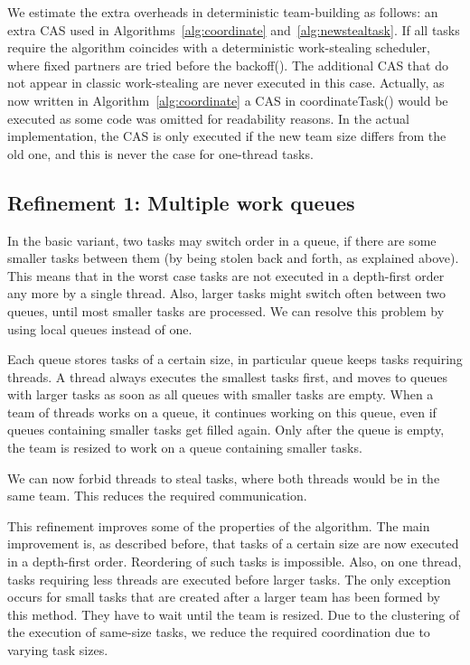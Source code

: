 \documentclass[preprint]{sigplanconf}
\begin{document}
We estimate the extra overheads in deterministic team-building as
follows: an extra CAS used in Algorithms~\ref{alg:coordinate}
and~\ref{alg:newstealtask}. If all tasks require  the algorithm
coincides with a deterministic work-stealing scheduler, where 
fixed partners are tried before the backoff(). The additional CAS that
do not appear in classic work-stealing are never executed in this
case. Actually, as now written in Algorithm~\ref{alg:coordinate} a CAS
in coordinateTask() would be executed as some code was omitted for
readability reasons. In the actual implementation, the CAS is only
executed if the new team size differs from the old one, and this is
never the case for one-thread tasks.

\subsection{Refinement 1: Multiple work queues}

In the basic variant, two tasks may switch order in a queue, if there
are some smaller tasks between them (by being stolen back and forth,
as explained above). This means that in the worst case tasks are not
executed in a depth-first order any more by a single thread. Also,
larger tasks might switch often between two queues, until most smaller
tasks are processed. We can resolve this problem by using 
local queues instead of one.

Each queue stores tasks of a certain size, in particular queue 
keeps tasks requiring  threads. A thread always executes the
smallest tasks first, and moves to queues with larger tasks as soon as
all queues with smaller tasks are empty. When a team of threads works
on a queue, it continues working on this queue, even if queues
containing smaller tasks get filled again. Only after the queue is
empty, the team is resized to work on a queue containing smaller
tasks.

We can now forbid threads to steal tasks, where both threads would
be in the same team. This reduces the required communication.

This refinement improves some of the properties of the algorithm. The
main improvement is, as described before, that tasks of a certain size
are now executed in a depth-first order. Reordering of such tasks is
impossible. Also, on one thread, tasks requiring less threads are
executed before larger tasks. The only exception occurs for small
tasks that are created after a larger team has been formed by this
method. They have to wait until the team is resized. Due to the
clustering of the execution of same-size tasks, we reduce the required
coordination due to varying task sizes.
\end{document}
